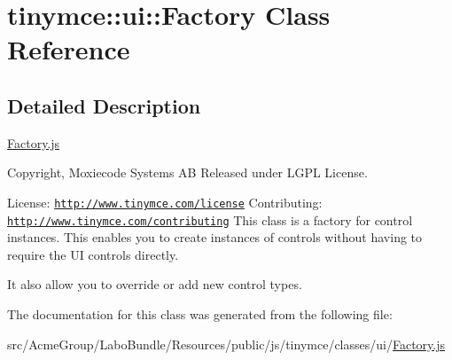 \hypertarget{classtinymce_1_1ui_1_1_factory}{\section{tinymce\+:\+:ui\+:\+:Factory Class Reference}
\label{classtinymce_1_1ui_1_1_factory}
}


\subsection{Detailed Description}
\hyperlink{_factory_8js}{Factory.\+js}

Copyright, Moxiecode Systems A\+B Released under L\+G\+P\+L License.

License\+: \href{http://www.tinymce.com/license}{\tt http\+://www.\+tinymce.\+com/license} Contributing\+: \href{http://www.tinymce.com/contributing}{\tt http\+://www.\+tinymce.\+com/contributing} This class is a factory for control instances. This enables you to create instances of controls without having to require the U\+I controls directly.

It also allow you to override or add new control types. 

The documentation for this class was generated from the following file\+:\begin{DoxyCompactItemize}
\item 
src/\+Acme\+Group/\+Labo\+Bundle/\+Resources/public/js/tinymce/classes/ui/\hyperlink{_factory_8js}{Factory.\+js}\end{DoxyCompactItemize}
